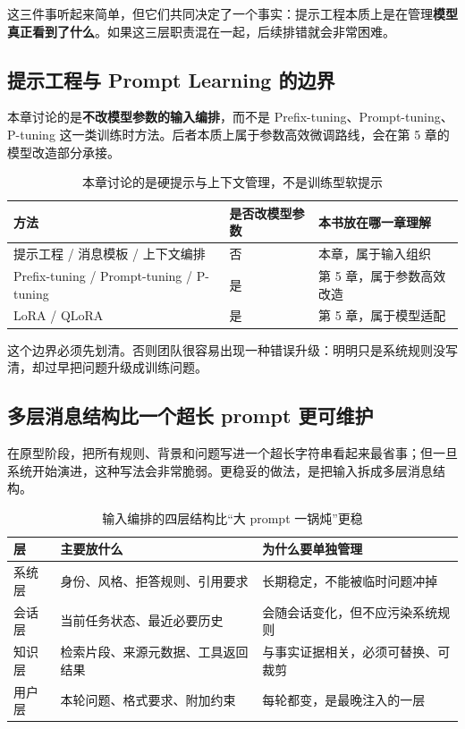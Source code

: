 这三件事听起来简单，但它们共同决定了一个事实：提示工程本质上是在管理\textbf{模型真正看到了什么}。如果这三层职责混在一起，后续排错就会非常困难。

\subsection{提示工程与 Prompt Learning 的边界}
本章讨论的是\textbf{不改模型参数的输入编排}，而不是 Prefix-tuning、Prompt-tuning、P-tuning 这一类训练时方法。后者本质上属于参数高效微调路线，会在第 5 章的模型改造部分承接。

\begin{table}[H]
\centering
\small
\begin{tabularx}{\textwidth}{>{\raggedright\arraybackslash}p{3.4cm}>{\raggedright\arraybackslash}p{3.6cm}>{\raggedright\arraybackslash}X}
\toprule
\textbf{方法} & \textbf{是否改模型参数} & \textbf{本书放在哪一章理解} \\
\midrule
提示工程 / 消息模板 / 上下文编排 & 否 & 本章，属于输入组织 \\
Prefix-tuning / Prompt-tuning / P-tuning & 是 & 第 5 章，属于参数高效改造 \\
LoRA / QLoRA & 是 & 第 5 章，属于模型适配 \\
\bottomrule
\end{tabularx}
\caption{本章讨论的是硬提示与上下文管理，不是训练型软提示}
\label{tab:prompt-boundary}
\end{table}

这个边界必须先划清。否则团队很容易出现一种错误升级：明明只是系统规则没写清，却过早把问题升级成训练问题。

\subsection{多层消息结构比一个超长 prompt 更可维护}
在原型阶段，把所有规则、背景和问题写进一个超长字符串看起来最省事；但一旦系统开始演进，这种写法会非常脆弱。更稳妥的做法，是把输入拆成多层消息结构。

\begin{table}[H]
\centering
\small
\begin{tabularx}{\textwidth}{>{\raggedright\arraybackslash}p{2.6cm}>{\raggedright\arraybackslash}p{3.3cm}>{\raggedright\arraybackslash}X}
\toprule
\textbf{层} & \textbf{主要放什么} & \textbf{为什么要单独管理} \\
\midrule
系统层 & 身份、风格、拒答规则、引用要求 & 长期稳定，不能被临时问题冲掉 \\
会话层 & 当前任务状态、最近必要历史 & 会随会话变化，但不应污染系统规则 \\
知识层 & 检索片段、来源元数据、工具返回结果 & 与事实证据相关，必须可替换、可裁剪 \\
用户层 & 本轮问题、格式要求、附加约束 & 每轮都变，是最晚注入的一层 \\
\bottomrule
\end{tabularx}
\caption{输入编排的四层结构比“大 prompt 一锅炖”更稳}
\label{tab:message-layers}
\end{table}

